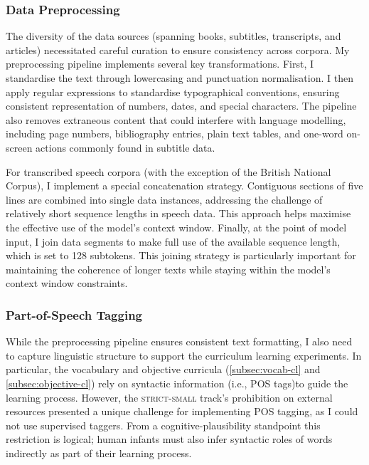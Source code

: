 \subsubsection{Data Preprocessing}
The diversity of the data sources (spanning books, subtitles, transcripts, and articles) necessitated careful curation to ensure consistency across corpora. My preprocessing pipeline implements several key transformations. First, I standardise the text through lowercasing and punctuation normalisation. I then apply regular expressions to standardise typographical conventions, ensuring consistent representation of numbers, dates, and special characters. The pipeline also removes extraneous content that could interfere with language modelling, including page numbers, bibliography entries, plain text tables, and one-word on-screen actions commonly found in subtitle data.

For transcribed speech corpora (with the exception of the British National Corpus), I implement a special concatenation strategy. Contiguous sections of five lines are combined into single data instances, addressing the challenge of relatively short sequence lengths in speech data. This approach helps maximise the effective use of the model's context window. Finally, at the point of model input, I join data segments to make full use of the available sequence length, which is set to 128 subtokens. This joining strategy is particularly important for maintaining the coherence of longer texts while staying within the model's context window constraints.

\subsubsection{Part-of-Speech Tagging}

While the preprocessing pipeline ensures consistent text formatting, I also need to capture linguistic structure to support the curriculum learning experiments. In particular, the vocabulary and objective curricula (\cref{subsec:vocab-cl} and \cref{subsec:objective-cl}) rely on syntactic information (i.e., POS tags)to guide the learning process. However, the \textsc{strict-small} track's prohibition on external resources presented a unique challenge for implementing POS tagging, as I could not use supervised taggers. From a cognitive-plausibility standpoint this restriction is logical; human infants must also infer syntactic roles of words indirectly as part of their learning process.

